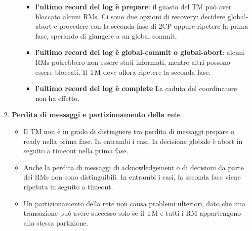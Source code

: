 \begin{enumerate}
\begin{itemize}
        \begin{itemize}
            \item \textbf{l’ultimo record del log è prepare}: il guasto del TM può aver bloccato alcuni RMs. Ci sono due opzioni di recovery: decidere global-abort e procedere con la seconda fase di 2CP oppure ripetere la prima fase, sperando di giungere a un global commit.
            \item \textbf{l’ultimo record del log è global-commit o global-abort}: alcuni RMs potrebbero non essere stati informati, mentre altri possono essere bloccati. Il TM deve allora ripetere la seconda fase.
            \item \textbf{l’ultimo record del log è complete} La caduta del coordinatore non ha effetto.
        \end{itemize}
    \end{itemize}
    \item \textbf{Perdita di messaggi e partizionamento della rete}
    \begin{itemize}
        \item  Il TM non è in grado di distinguere tra perdita di messaggi prepare o ready nella prima fase. In entrambi i casi, la decisione globale è abort in seguito a timeout nella prima fase.
        \item Anche la perdita di messaggi di acknowledgement o di decisioni da parte dei RMs non sono distinguibili. In entrambi i casi, la seconda fase viene ripetuta in seguito a timeout.
        \item Un partizionamento della rete non causa problemi ulteriori, dato che una transazione può avere successo solo se il TM e tutti i RM appartengono alla stessa partizione.
    \end{itemize}
\end{enumerate}

